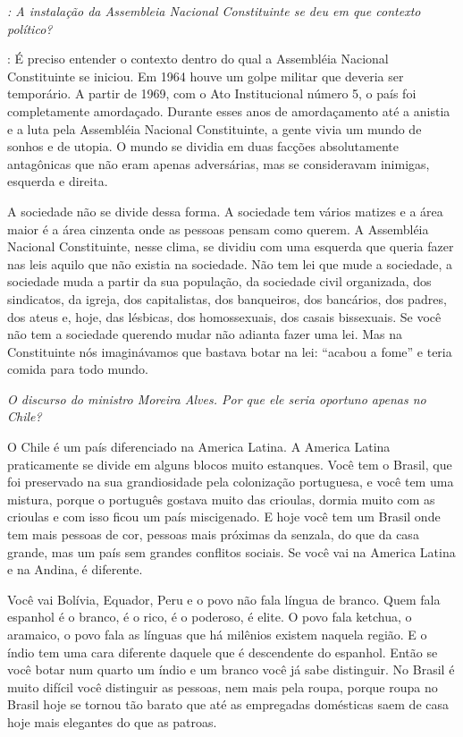 \emph{: A instalação da Assembleia Nacional Constituinte se deu em que
contexto político?}

: É preciso entender o contexto dentro do qual a
Assembléia Nacional Constituinte se iniciou. Em 1964 houve um golpe
militar que deveria ser temporário. A partir de 1969, com o Ato
Institucional número 5, o país foi completamente amordaçado. Durante
esses anos de amordaçamento até a anistia e a luta pela Assembléia
Nacional Constituinte, a gente vivia um mundo de sonhos e de utopia. O
mundo se dividia em duas facções absolutamente antagônicas que não eram
apenas adversárias, mas se consideravam inimigas, esquerda e direita.

A sociedade não se divide dessa forma. A sociedade tem vários matizes e
a área maior é a área cinzenta onde as pessoas pensam como querem. A
Assembléia Nacional Constituinte, nesse clima, se dividiu com uma
esquerda que queria fazer nas leis aquilo que não existia na sociedade.
Não tem lei que mude a sociedade, a sociedade muda a partir da sua
população, da sociedade civil organizada, dos sindicatos, da igreja, dos
capitalistas, dos banqueiros, dos bancários, dos padres, dos ateus e,
hoje, das lésbicas, dos homossexuais, dos casais bissexuais. Se você não
tem a sociedade querendo mudar não adianta fazer uma lei. Mas na
Constituinte nós imaginávamos que bastava botar na lei: ``acabou a
fome'' e teria comida para todo mundo.

\medskip

\noindent\emph{O discurso do ministro Moreira Alves. Por que ele seria oportuno
apenas no Chile?}

O Chile é um país diferenciado na America Latina. A
America Latina praticamente se divide em alguns blocos muito estanques.
Você tem o Brasil, que foi preservado na sua grandiosidade pela
colonização portuguesa, e você tem uma mistura, porque o português
gostava muito das crioulas, dormia muito com as crioulas e com isso
ficou um país miscigenado. E hoje você tem um Brasil onde tem mais
pessoas de cor, pessoas mais próximas da senzala, do que da casa grande,
mas um país sem grandes conflitos sociais. Se você vai na America Latina
e na Andina, é diferente.

Você vai Bolívia, Equador, Peru e o povo não fala língua de branco. Quem
fala espanhol é o branco, é o rico, é o poderoso, é elite. O povo fala
ketchua, o aramaico, o povo fala as línguas que há milênios existem
naquela região. E o índio tem uma cara diferente daquele que é
descendente do espanhol. Então se você botar num quarto um índio e um
branco você já sabe distinguir. No Brasil é muito difícil você
distinguir as pessoas, nem mais pela roupa, porque roupa no Brasil hoje
se tornou tão barato que até as empregadas domésticas saem de casa hoje
mais elegantes do que as patroas.

